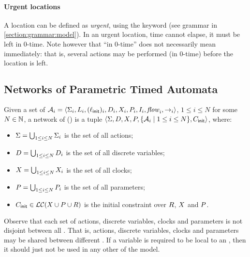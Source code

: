 \paragraph{Urgent locations}
A location can be defined as \emph{urgent}, using the keyword  (see grammar in  \cref{section:grammar:model}).
In an urgent location, time cannot elapse, \ie{} it must be left in $0$-time.
Note however that ``in $0$-time'' does not necessarily mean immediately: that is, several actions may be performed (in $0$-time) before the location is left.





\subsection{Networks of \imitator{} Parametric Timed Automata}

\begin{definition}[\NIPTA{}]
	Given a set of \IPTA{} $\mathcal{A}_i = \langle\Sigma_i, L_i, (\ell_{\textsf{init}})_i, D_i, X_i, P_i, I_i, \mathit{flow}_i, {\rightarrow}_i\rangle$, $1 \leq i \leq N$ for some $N \in \mathbb N$,
	a network of \IPTA{} (\emph{\NIPTA{}}) is a tuple
	$\langle\Sigma, D, X, P, \{ \mathcal{A}_i \mid 1 \leq i \leq N \}, C_{\textsf{init}}\rangle$, where:
	\begin{itemize}
		\item $\Sigma = \bigcup_{1 \leq i \leq N} \Sigma_i$ is the set of all actions;
		\item $D = \bigcup_{1 \leq i \leq N} D_i$ is the set of all discrete variables;
		\item $X = \bigcup_{1 \leq i \leq N} X_i$ is the set of all clocks;
		\item $P = \bigcup_{1 \leq i \leq N} P_i$ is the set of all parameters;
		\item $C_{\textsf{init}} \in \mathcal{LC}(X \cup P \cup R)$ is the initial constraint over $R$, $X$ and $P$. %
	\end{itemize}
\end{definition}

Observe that each set of actions, discrete variables, clocks and parameters is not disjoint between all \IPTA{}.
That is, actions, discrete variables, clocks and parameters may be shared between different \IPTA{}.
If a variable is required to be local to an \IPTA{}, then it should just not be used in any other \IPTA{} of the model.

